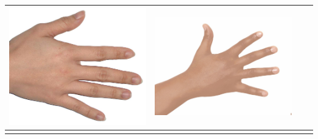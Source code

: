 \begin{longtable}{|N||c|c|c|}
\begin{minipage}{.29\textwidth}
    \includegraphics[width=\textwidth,height=\textheight,keepaspectratio]{../inputs/hand_light.jpg}
  \end{minipage} & 
  \begin{minipage}{.29\textwidth}
    \includegraphics[width=\textwidth,height=\textheight,keepaspectratio]{../rc_test/outputs/20170517_proportional_corrected_test_alpha10/hand_dark_to_hand_light.jpg}
  \end{minipage} \\
\hline  \label{row:prop_correct_test_a10_hand_dark_to_hand_pale} &
  \begin{minipage}{.29\textwidth}

\end{minipage}
\end{longtable}
